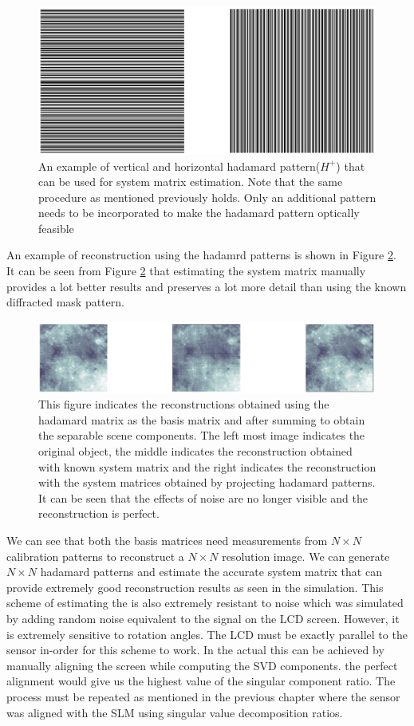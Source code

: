 \begin{figure}[h]
\centering
\includegraphics[width = \linewidth]{pics/hadamard_ex.png}
\caption{An example of vertical and horizontal hadamard pattern($H^+$) that can be used for system matrix estimation. Note that the same procedure as mentioned previously holds. Only an additional pattern needs to be incorporated to make the hadamard pattern optically feasible }
\label{fig:hadamrd_ex}
\end{figure}
An example of reconstruction using the hadamrd patterns is shown in Figure \ref{fig:hadamrd_rec}. It can be seen from Figure \ref{fig:hadamrd_rec} that estimating the system matrix manually provides a lot better results and preserves a lot more detail than using the known diffracted mask pattern. 
\begin{figure}[h]
\centering
\includegraphics[width = \linewidth]{pics/hadamard_rec.png}
\caption{This figure indicates the reconstructions obtained using the hadamard matrix as the basis matrix and after summing to obtain the separable scene components. The left most image indicates the original object, the middle indicates the reconstruction obtained with known system matrix and the right indicates the reconstruction with the system matrices obtained by projecting hadamard patterns. It can be seen that the effects of noise are no longer visible and the reconstruction is perfect. }
\label{fig:hadamrd_rec}
\end{figure}

We can see that both the basis matrices need measurements from $N\times N$ calibration patterns to reconstruct a $N \times N$ resolution image. We can generate $N \times N$ hadamard patterns and estimate the accurate system matrix that can provide extremely good reconstruction results as seen in the simulation. This scheme of estimating the is also extremely resistant to noise which was simulated by adding random noise equivalent to the signal on the LCD screen. However, it is extremely sensitive to rotation angles. The LCD must be exactly parallel to the sensor in-order for this scheme to work. In the actual this can be achieved by manually aligning the screen while computing the SVD components. the perfect alignment would give us the highest value of the singular component ratio. The process must be repeated as mentioned in the previous chapter where the sensor was aligned with the SLM using singular value decomposition ratios.   
